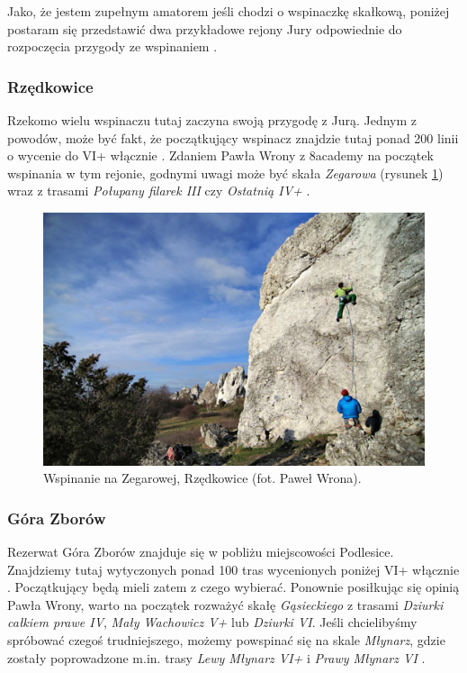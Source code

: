 \documentclass{article}
\begin{document}
Jako, że jestem zupełnym amatorem jeśli chodzi o wspinaczkę skałkową, poniżej postaram się przedstawić dwa przykładowe rejony Jury odpowiednie do rozpoczęcia przygody ze wspinaniem \cite{jura-okiennik}. 

\subsubsection{Rzędkowice}
Rzekomo wielu wspinaczu tutaj zaczyna swoją przygodę z Jurą. Jednym z powodów, może być fakt, że początkujący wspinacz znajdzie tutaj ponad 200 linii o wycenie do VI+ włącznie \cite{jura-rzedkowice}. Zdaniem Pawła Wrony z 8academy na początek wspinania w tym rejonie, godnymi uwagi może być skała \textit{Zegarowa} (rysunek \ref{zegarowa}) wraz z trasami \textit{Połupany filarek III} czy \textit{Ostatnią IV+} \cite{jura-rzedkowice}.

\begin{figure}[!htbp]
	\begin{center}
		\includegraphics[width=0.9\linewidth]{images/jura-zegarowa.eps}
	\end{center}
	\caption{Wspinanie na Zegarowej, Rzędkowice (fot. Paweł Wrona)\cite{jura-rzedkowice}.}
	\label{zegarowa}
\end{figure}

\subsubsection{Góra Zborów}
Rezerwat Góra Zborów znajduje się w pobliżu miejscowości Podlesice. Znajdziemy tutaj wytyczonych ponad 100 tras wycenionych poniżej VI+ włącznie \cite{topo-gora-zborow}. Początkujący będą mieli zatem z czego wybierać. Ponownie posiłkując się opinią Pawła Wrony, warto na początek rozważyć skałę \textit{Gąsieckiego} z trasami \textit{Dziurki całkiem prawe IV}, \textit{Mały Wachowicz V+} lub \textit{Dziurki VI}. Jeśli chcielibyśmy spróbować czegoś trudniejszego, możemy powspinać się na skale \textit{Młynarz}, gdzie zostały poprowadzone m.in. trasy \textit{Lewy Młynarz VI+} i \textit{Prawy Młynarz VI} \cite{jura-gora-zborow}.
\end{document}
